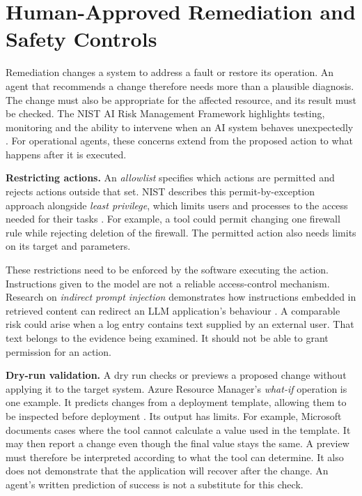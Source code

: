 \section{Human-Approved Remediation and Safety Controls}
\label{sec:background:remediation}

Remediation changes a system to address a fault or restore its operation.
An agent that recommends a change therefore needs more than a plausible
diagnosis. The change must also be appropriate for the affected resource,
and its result must be checked. The NIST AI Risk Management Framework
highlights testing, monitoring and the ability to intervene when an AI
system behaves unexpectedly \parencite[pp.~14--15]{tabassi2023airmf}.
For operational agents, these concerns extend from the proposed action
to what happens after it is executed.

\noindent\textbf{Restricting actions.} An \emph{allowlist} specifies which
actions are permitted and rejects actions outside that set. NIST describes
this permit-by-exception approach alongside \emph{least privilege}, which
limits users and processes to the access needed for their tasks
\parencite[AC-6 and CM-7(5)]{nist2020securitycontrols}. For example, a tool
could permit changing one firewall rule while rejecting deletion of the
firewall. The permitted action also needs limits on its target and parameters.

These restrictions need to be enforced by the software executing the
action. Instructions given to the model are not a reliable access-control
mechanism. Research on \emph{indirect prompt injection} demonstrates how
instructions embedded in retrieved content can redirect an LLM
application's behaviour \parencite{greshake2023indirect}. A comparable
risk could arise when a log entry contains text supplied by an external
user. That text belongs to the evidence being examined. It should not
be able to grant permission for an action.

\noindent\textbf{Dry-run validation.} A dry run checks or previews a proposed
change without applying it to the target system. Azure Resource Manager's
\emph{what-if} operation is one example. It predicts changes from a
deployment template, allowing them to be inspected before deployment
\parencite{microsoft2026whatif}. Its output has limits. For example,
Microsoft documents cases where the tool cannot calculate a value used
in the template. It may then report a change even though the final value
stays the same. A preview must therefore be interpreted according to what
the tool can determine. It also does not demonstrate that the application
will recover after the change. An agent's written prediction of success
is not a substitute for this check.

